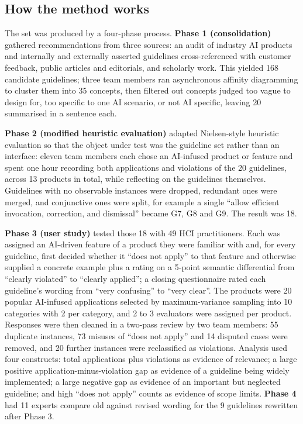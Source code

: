 \subsection{How the method works}

The set was produced by a four-phase process. \textbf{Phase 1 (consolidation)} gathered recommendations from three sources: an audit of industry AI products and internally and externally asserted guidelines cross-referenced with customer feedback, public articles and editorials, and scholarly work. This yielded 168 candidate guidelines; three team members ran asynchronous affinity diagramming to cluster them into 35 concepts, then filtered out concepts judged too vague to design for, too specific to one AI scenario, or not AI specific, leaving 20 summarised in a sentence each.

\textbf{Phase 2 (modified heuristic evaluation)} adapted Nielsen-style heuristic evaluation so that the object under test was the guideline set rather than an interface: eleven team members each chose an AI-infused product or feature and spent one hour recording both applications and violations of the 20 guidelines, across 13 products in total, while reflecting on the guidelines themselves. Guidelines with no observable instances were dropped, redundant ones were merged, and conjunctive ones were split, for example a single ``allow efficient invocation, correction, and dismissal'' became G7, G8 and G9. The result was 18.

\textbf{Phase 3 (user study)} tested those 18 with 49 HCI practitioners. Each was assigned an AI-driven feature of a product they were familiar with and, for every guideline, first decided whether it ``does not apply'' to that feature and otherwise supplied a concrete example plus a rating on a 5-point semantic differential from ``clearly violated'' to ``clearly applied''; a closing questionnaire rated each guideline's wording from ``very confusing'' to ``very clear''. The products were 20 popular AI-infused applications selected by maximum-variance sampling into 10 categories with 2 per category, and 2 to 3 evaluators were assigned per product. Responses were then cleaned in a two-pass review by two team members: 55 duplicate instances, 73 misuses of ``does not apply'' and 14 disputed cases were removed, and 20 further instances were reclassified as violations. Analysis used four constructs: total applications plus violations as evidence of relevance; a large positive application-minus-violation gap as evidence of a guideline being widely implemented; a large negative gap as evidence of an important but neglected guideline; and high ``does not apply'' counts as evidence of scope limits. \textbf{Phase 4} had 11 experts compare old against revised wording for the 9 guidelines rewritten after Phase 3.

